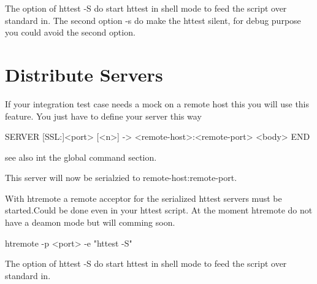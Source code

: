 The option of httest -S do start httest in shell mode to feed the script over standard in.
The second option -s do make the httest silent, for debug purpose you could avoid the second
option.

\section{Distribute Servers}
\label{chap:distributeClients}

If your integration test case needs a mock on a remote host this you will use this feature.
You just have to define your server this way

\begin{usplisting}
  SERVER [SSL:]<port> [<n>] -> <remote-host>:<remote-port>
  <body>
  END
\end{usplisting}

see also int the global command section.

This server will now be serialzied to remote-host:remote-port.

With htremote a remote acceptor for the serialized httest servers must be started.Could
be done even in your httest script. At the moment htremote do not have a deamon mode but
will comming soon.

\begin{usplisting}
  htremote -p <port> -e "httest -S"
\end{usplisting}

The option of httest -S do start httest in shell mode to feed the script over standard in.

